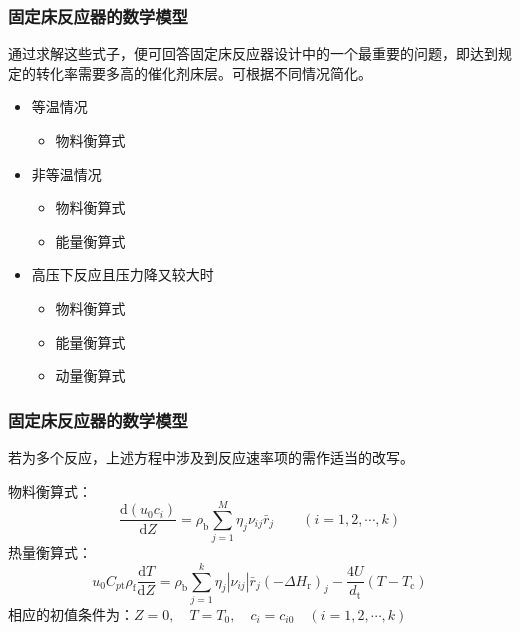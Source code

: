 \begin{frame}
    \frametitle{固定床反应器的数学模型}

    通过求解这些式子，便可回答固定床反应器设计中的一个最重要的问题，即达到规定的转化率需要多高的催化剂床层。可根据不同情况简化。

    \begin{itemize}
        \item 等温情况
            \begin{itemize}
                \item 物料衡算式
            \end{itemize}        
        \item 非等温情况
            \begin{itemize}
                \item 物料衡算式
                \item 能量衡算式
            \end{itemize} 
        \item 高压下反应且压力降又较大时
        \begin{itemize}
            \item 物料衡算式
            \item 能量衡算式
            \item 动量衡算式
        \end{itemize}
    \end{itemize}

\end{frame}


\begin{frame}
    \frametitle{固定床反应器的数学模型}

    若为多个反应，上述方程中涉及到反应速率项的需作适当的改写。
    
    物料衡算式：
    \[
        \frac{\mathrm{d}(u_{0} c_{i})}{\mathrm{d} Z}=\rho_{\mathrm{b}} \sum_{j=1}^{M} \eta_{j} \nu_{i j} \bar{r}_{j} \qquad(i=1,2, \cdots, k)
    \]
    热量衡算式：
    \[
        u_{0} C_{p \mathrm{t}} \rho_{\mathrm{f}} \frac{\mathrm{d} T}{\mathrm{d} Z}=\rho_{\mathrm{b}} \sum_{j=1}^{k} \eta_{j}\left|\nu_{i j}\right| \bar{r}_{j}(-\Delta H_{\mathrm{r}})_{j}-\frac{4 U}{d_{\mathrm{t}}}(T-T_{\mathrm{c}})
    \]
    相应的初值条件为：$Z=0,  \quad T=T_{0}, \quad c_{i}=c_{i0} \quad (i=1,2, \cdots, k)$

\end{frame}


